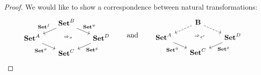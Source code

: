 \documentclass[11pt, oneside, article]{memoir}
\theoremstyle{plain}
\theoremstyle{definition}
\theoremstyle{remark}
\newcommand{\tn}[1]{\textnormal{#1}}
\newcommand{\namedcat}[1]{\mathbf{#1}}
\newcommand{\cat}[1]{\mathbf{#1}}
\newcommand{\Set}{\namedcat{Set}}
\newcommand{\CoalgOn}[2]{{#2}^{#1}}
\newcommand{\CoalgSet}[1]{\CoalgOn{#1}{\Set}}
\newcommand{\com}[2]{{#1}^{#2}}
\newcommand{\con}[2]{{#1}^{#2}}
\newcommand{\cmnd}[1]{{#1}}
\newcommand{\cA}{\cmnd{A}}
\newcommand{\cB}{\cmnd{B}}
\newcommand{\cC}{\cmnd{C}}
\newcommand{\cD}{\cmnd{D}}
\newcommand{\bB}{\cat{B}}
\newcommand{\ASet}{\CoalgSet{\cA}}
\newcommand{\BSet}{\CoalgSet{\cB}}
\newcommand{\CSet}{\CoalgSet{\cC}}
\newcommand{\DSet}{\CoalgSet{\cD}}
\newcommand{\hh}[2][]{#1 \tn{#2} #1}
\newcommand{\qqand}{\hh[\qquad]{and}}
\begin{document}
\begin{proof}
  \noindent
  We would like to show a correspondence between natural transformations:
  \[
    \begin{tikzcd}[column sep=17, row sep=5]
      & \BSet & \\
      \ASet && \DSet \\
      & \CSet &
      \arrow["{\con{\Set}{f}}"'{pos=0.35}, from=1-2, to=2-1]
      \arrow["{\Rightarrow_\sigma}"{description}, shift left, draw=none, from=1-2, to=3-2]
      \arrow["{\com{\Set}{\psi}}"{pos=0.35}, from=1-2, to=2-3]
      \arrow["{\con{\Set}{g}}", from=2-3, to=3-2]
      \arrow["{\com{\Set}{\phi}}"', from=2-1, to=3-2]
    \end{tikzcd}
    \qqand
    \begin{tikzcd}[column sep=17, row sep=5]
      & \bB & \\
      \ASet && \DSet \\
      & \CSet &
      \arrow[dashed, from=1-2, to=2-1]
      \arrow["{\Rightarrow_{\sigma'}}"{description}, shift left, draw=none, from=1-2, to=3-2]
      \arrow[dashed, from=1-2, to=2-3]
      \arrow["{\con{\Set}{g}}", from=2-3, to=3-2]
      \arrow["{\com{\Set}{\phi}}"', from=2-1, to=3-2]
    \end{tikzcd}
  \]

\end{proof}
\end{document}
